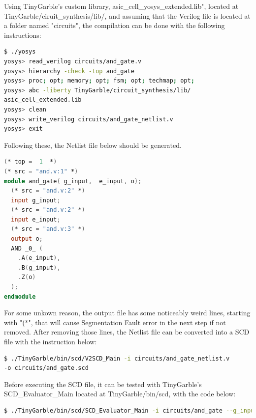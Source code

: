 \begin{refsection}
Using TinyGarble's custom library, asic\_cell\_yosys\_extended.lib", located at TinyGarble/ciruit\_synthesis/lib/, and assuming that the Verilog file is located at a folder named "circuits", the compilation can be done with the following instructions:

\begin{lstlisting}[caption={Yosys instructions to compile the HDL file to a Netlist file}, language=bash, captionpos=b] 
$ ./yosys
yosys> read_verilog circuits/and_gate.v
yosys> hierarchy -check -top and_gate
yosys> proc; opt; memory; opt; fsm; opt; techmap; opt;
yosys> abc -liberty TinyGarble/circuit_synthesis/lib/
asic_cell_extended.lib
yosys> clean
yosys> write_verilog circuits/and_gate_netlist.v
yosys> exit					
\end{lstlisting}

Following these, the Netlist file below should be generated.

\begin{lstlisting}[caption={and\_gate\_netlist.v}, language=Verilog, captionpos=b] 
(* top =  1  *)
(* src = "and.v:1" *)
module and_gate( g_input,  e_input, o);
  (* src = "and.v:2" *)
  input g_input;
  (* src = "and.v:2" *)
  input e_input;
  (* src = "and.v:3" *)
  output o;
  AND _0_ (
    .A(e_input),
    .B(g_input),
    .Z(o)
  );
endmodule
\end{lstlisting}

For some unkown reason, the output file has some noticeably weird lines, starting with "(*", that will cause Segmentation Fault error in the next step if not removed.
After removing those lines, the Netlist file can be converted into a SCD file with the instruction below:

\begin{lstlisting}[caption={Installation of Yosys-abc}, language=bash, captionpos=b] 
$ ./TinyGarble/bin/scd/V2SCD_Main -i circuits/and_gate_netlist.v 
-o circuits/and_gate.scd		
\end{lstlisting}

Before executing the SCD file, it can be tested with TinyGarble's SCD\_Evaluator\_Main located at TinyGarble/bin/scd, with the code below:

\begin{lstlisting}[caption={Testing a SCD file}, language=bash, captionpos=b] 
$ ./TinyGarble/bin/scd/SCD_Evaluator_Main -i circuits/and_gate --g_input 1 --e_input 0
\end{lstlisting}

\newpage


\end{refsection}
